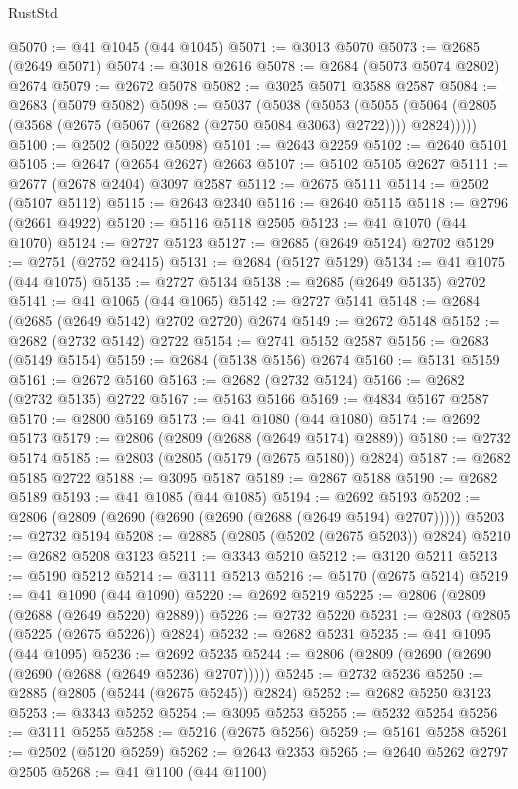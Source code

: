\begin{lexlean}{RustStd}
\begin{coremodule}
@5070 := @41 @1045 (@44 @1045)
@5071 := @3013 @5070
@5073 := @2685 (@2649 @5071)
@5074 := @3018 @2616
@5078 := @2684 (@5073 @5074 @2802) @2674
@5079 := @2672 @5078
@5082 := @3025 @5071 @3588 @2587
@5084 := @2683 (@5079 @5082)
@5098 := @5037
    (@5038
      (@5053
        (@5055 (@5064 (@2805 (@3568 (@2675 (@5067 (@2682 (@2750 @5084 @3063) @2722)))) @2824)))))
@5100 := @2502 (@5022 @5098)
@5101 := @2643 @2259
@5102 := @2640 @5101
@5105 := @2647 (@2654 @2627) @2663
@5107 := @5102 @5105 @2627
@5111 := @2677 (@2678 @2404) @3097 @2587
@5112 := @2675 @5111
@5114 := @2502 (@5107 @5112)
@5115 := @2643 @2340
@5116 := @2640 @5115
@5118 := @2796 (@2661 @4922)
@5120 := @5116 @5118 @2505
@5123 := @41 @1070 (@44 @1070)
@5124 := @2727 @5123
@5127 := @2685 (@2649 @5124) @2702
@5129 := @2751 (@2752 @2415)
@5131 := @2684 (@5127 @5129)
@5134 := @41 @1075 (@44 @1075)
@5135 := @2727 @5134
@5138 := @2685 (@2649 @5135) @2702
@5141 := @41 @1065 (@44 @1065)
@5142 := @2727 @5141
@5148 := @2684 (@2685 (@2649 @5142) @2702 @2720) @2674
@5149 := @2672 @5148
@5152 := @2682 (@2732 @5142) @2722
@5154 := @2741 @5152 @2587
@5156 := @2683 (@5149 @5154)
@5159 := @2684 (@5138 @5156) @2674
@5160 := @5131 @5159
@5161 := @2672 @5160
@5163 := @2682 (@2732 @5124)
@5166 := @2682 (@2732 @5135) @2722
@5167 := @5163 @5166
@5169 := @4834 @5167 @2587
@5170 := @2800 @5169
@5173 := @41 @1080 (@44 @1080)
@5174 := @2692 @5173
@5179 := @2806 (@2809 (@2688 (@2649 @5174) @2889))
@5180 := @2732 @5174
@5185 := @2803 (@2805 (@5179 (@2675 @5180)) @2824)
@5187 := @2682 @5185 @2722
@5188 := @3095 @5187
@5189 := @2867 @5188
@5190 := @2682 @5189
@5193 := @41 @1085 (@44 @1085)
@5194 := @2692 @5193
@5202 := @2806 (@2809 (@2690 (@2690 (@2690 (@2688 (@2649 @5194) @2707)))))
@5203 := @2732 @5194
@5208 := @2885 (@2805 (@5202 (@2675 @5203)) @2824)
@5210 := @2682 @5208 @3123
@5211 := @3343 @5210
@5212 := @3120 @5211
@5213 := @5190 @5212
@5214 := @3111 @5213
@5216 := @5170 (@2675 @5214)
@5219 := @41 @1090 (@44 @1090)
@5220 := @2692 @5219
@5225 := @2806 (@2809 (@2688 (@2649 @5220) @2889))
@5226 := @2732 @5220
@5231 := @2803 (@2805 (@5225 (@2675 @5226)) @2824)
@5232 := @2682 @5231
@5235 := @41 @1095 (@44 @1095)
@5236 := @2692 @5235
@5244 := @2806 (@2809 (@2690 (@2690 (@2690 (@2688 (@2649 @5236) @2707)))))
@5245 := @2732 @5236
@5250 := @2885 (@2805 (@5244 (@2675 @5245)) @2824)
@5252 := @2682 @5250 @3123
@5253 := @3343 @5252
@5254 := @3095 @5253
@5255 := @5232 @5254
@5256 := @3111 @5255
@5258 := @5216 (@2675 @5256)
@5259 := @5161 @5258
@5261 := @2502 (@5120 @5259)
@5262 := @2643 @2353
@5265 := @2640 @5262 @2797 @2505
@5268 := @41 @1100 (@44 @1100)

\end{coremodule}
\end{lexlean}
